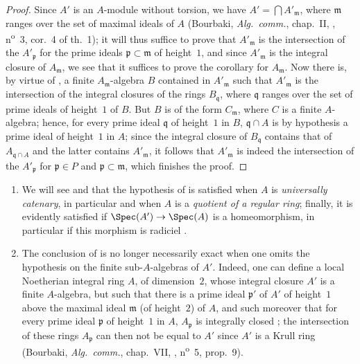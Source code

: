 \begin{proof}
Since $A'$ is an $A$-module without torsion, we have $A'=\bigcap A'_\mathfrak{m}$, where $\mathfrak{m}$ ranges over the set of maximal ideals of $A$ (Bourbaki, \emph{Alg.~comm.}, chap.~II, , n\textsuperscript{o}~3, cor.~4 of th.~1);
it will thus suffice to prove that $A'_\mathfrak{m}$ is the intersection of the $A'_\mathfrak{p}$ for the prime ideals $\mathfrak{p}\subset\mathfrak{m}$ of height~$1$, and since $A'_\mathfrak{m}$ is the integral closure of $A_\mathfrak{m}$, we see that it suffices to prove the corollary for $A_\mathfrak{m}$.
Now there is, by virtue of , a finite $A_\mathfrak{m}$-algebra $B$ contained in $A'_\mathfrak{m}$ such that $A'_\mathfrak{m}$ is the intersection of the integral closures of the rings $B_\mathfrak{q}$, where $\mathfrak{q}$ ranges over the set of prime ideals of height~$1$ of $B$.
But $B$ is of the form $C_\mathfrak{m}$, where $C$ is a finite $A$-algebra; hence, for every prime ideal $\mathfrak{q}$ of height~$1$ in $B$, $\mathfrak{q}\cap A$ is by hypothesis a prime ideal of height~$1$ in $A$; since the integral closure of $B_\mathfrak{q}$ contains that of $A_{\mathfrak{q}\cap A}$ and the latter contains $A'_\mathfrak{m}$, it follows that $A'_\mathfrak{m}$ is indeed the intersection of the $A'_\mathfrak{p}$ for $\mathfrak{p}\in P$ and $\mathfrak{p}\subset\mathfrak{m}$, which finishes the proof.
\end{proof}

\begin{remarks}[23.2.10]
\label{0.23.2.10}
\medskip\noindent
\begin{enumerate}
  \item[{\rm(i)}] We will see  and  that the hypothesis of  is satisfied when $A$ is \emph{universally catenary}, in particular  and  when $A$ is a \emph{quotient of a regular ring}; finally, it is evidently satisfied if $\Spec(A')\to\Spec(A)$ is a homeomorphism, in particular if this morphism is radiciel .
  \item[{\rm(ii)}] The conclusion of  is no longer necessarily exact when one omits the hypothesis on the finite sub-$A$-algebras of $A'$.
    Indeed, one can define a local Noetherian integral ring $A$, of dimension~$2$, whose integral closure $A'$ is a finite $A$-algebra, but such that there is a prime ideal $\mathfrak{p}'$ of $A'$ of height~$1$ above the maximal ideal $\mathfrak{m}$ (of height~$2$) of $A$, and such moreover that for every prime ideal $\mathfrak{p}$ of height~$1$ in $A$, $A_\mathfrak{p}$ is integrally closed ; the intersection of these rings $A_\mathfrak{p}$ can then not be equal to $A'$ since $A'$ is a Krull ring (Bourbaki, \emph{Alg.~comm.}, chap.~VII, , n\textsuperscript{o}~5, prop.~9).
\end{enumerate}
\end{remarks}
